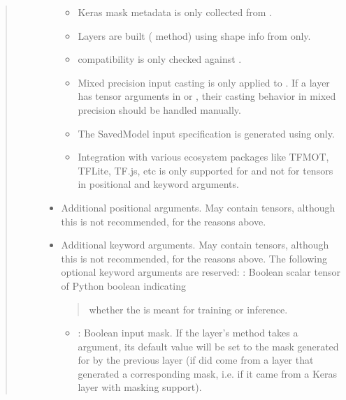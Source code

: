 \documentclass[letterpaper,10pt,english]{sphinxmanual}
\begin{document}
\begin{fulllineitems}
\begin{fulllineitems}
\begin{quote}
\begin{description}
\begin{itemize}
\begin{itemize}
\item {} 
\sphinxAtStartPar
Keras mask metadata is only collected from .

\item {} 
\sphinxAtStartPar
Layers are built ( method)
using shape info from  only.

\item {} 
\sphinxAtStartPar
{} compatibility is only checked against .

\item {} 
\sphinxAtStartPar
Mixed precision input casting is only applied to .
If a layer has tensor arguments in  or , their
casting behavior in mixed precision should be handled manually.

\item {} 
\sphinxAtStartPar
The SavedModel input specification is generated using 
only.

\item {} 
\sphinxAtStartPar
Integration with various ecosystem packages like TFMOT, TFLite,
TF.js, etc is only supported for  and not for tensors in
positional and keyword arguments.

\end{itemize}


\item {} 
\sphinxAtStartPar
{} \textendash{} Additional positional arguments. May contain tensors, although
this is not recommended, for the reasons above.

\item {} 
\sphinxAtStartPar
{} \textendash{} 
\sphinxAtStartPar
Additional keyword arguments. May contain tensors, although
this is not recommended, for the reasons above.
The following optional keyword arguments are reserved:
\sphinxhyphen{} : Boolean scalar tensor of Python boolean indicating
\begin{quote}

\sphinxAtStartPar
whether the  is meant for training or inference.
\end{quote}
\begin{itemize}
\item {} 
\sphinxAtStartPar
{}: Boolean input mask. If the layer’s  method takes a
 argument, its default value will be set to the mask
generated for  by the previous layer (if  did come
from a layer that generated a corresponding mask, i.e. if it came
from a Keras layer with masking support).


\end{itemize}
\end{itemize}
\end{description}
\end{quote}
\end{fulllineitems}
\end{fulllineitems}
\end{document}
